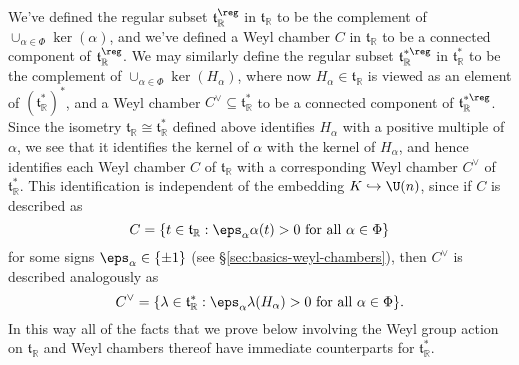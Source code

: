 \documentclass[reqno]{amsart} 
\begin{document}
We've defined the regular subset $\mathfrak{t}_{\mathbb{R}}^{\reg}$ in $\mathfrak{t}_{\mathbb{R}}$ to be the complement of $\cup_{\alpha \in \Phi} \ker(\alpha)$, and we've defined a Weyl chamber $C$ in $\mathfrak{t}_{\mathbb{R}}$ to be a connected component of $\mathfrak{t}_{\mathbb{R}}^{\reg}$.  We may similarly define the regular subset $\mathfrak{t}_{\mathbb{R}}^{* \reg}$ in $\mathfrak{t}_{\mathbb{R}}^*$ to be the complement of $\cup_{\alpha \in \Phi} \ker(H_\alpha)$, where now $H_\alpha \in \mathfrak{t}_{\mathbb{R}}$ is viewed as an element of $(\mathfrak{t}_{\mathbb{R}}^*)^*$, and a Weyl chamber $C^\vee \subseteq \mathfrak{t}_{\mathbb{R}}^*$ to be a connected component of $\mathfrak{t}_{\mathbb{R}}^{*\reg}$.  Since the isometry $\mathfrak{t}_{\mathbb{R}} \cong \mathfrak{t}_{\mathbb{R}}^*$ defined above identifies $H_\alpha$ with a positive multiple of $\alpha$, we see that it identifies the kernel of $\alpha$ with the kernel of $H_\alpha$, and hence identifies each Weyl chamber $C$ of $\mathfrak{t}_{\mathbb{R}}$ with a corresponding Weyl chamber $C^\vee$ of $\mathfrak{t}_{\mathbb{R}}^*$.  This identification is independent of the embedding $K \hookrightarrow \U(n)$, since if $C$ is described as
\begin{equation}\label{eqn:}
  C = \{t  \in \mathfrak{t}_{\mathbb{R}} : \eps_\alpha \alpha(t) > 0 \text{ for all } \alpha \in
  \Phi  \}
\end{equation}
for some signs $\eps_\alpha \in \{\pm 1\}$ (see \S\ref{sec:basics-weyl-chambers}), then $C^\vee$ is described analogously as
\begin{equation}\label{eqn:}
  C^\vee
  = \{\lambda
  \in \mathfrak{t}_{\mathbb{R}}^*
  : \eps_\alpha
  \lambda(H_\alpha) > 0 \text{ for all } \alpha \in
  \Phi  \}.
\end{equation}
In this way all of the facts that we prove below involving the Weyl group action on $\mathfrak{t}_{\mathbb{R}}$ and Weyl chambers thereof have immediate counterparts for $\mathfrak{t}_{\mathbb{R}}^*$.
\end{document}
